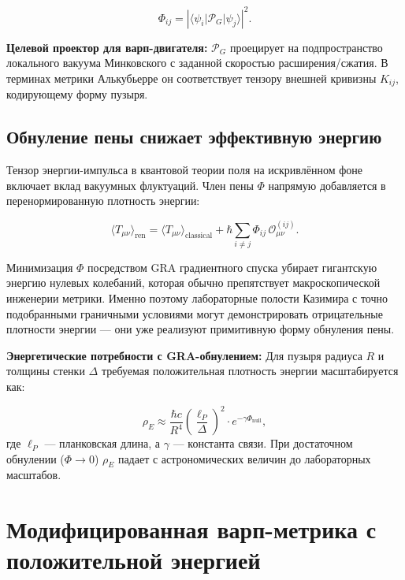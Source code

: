 \documentclass[11pt]{article}
\begin{document}
\begin{equation}
\Phi_{ij} = \left| \langle \psi_i | \mathcal{P}_G | \psi_j \rangle \right|^2.
\label{eq:foam_cell}
\end{equation}

\textbf{Целевой проектор для варп-двигателя:} $\mathcal{P}_G$ проецирует на подпространство локального вакуума Минковского с заданной скоростью расширения/сжатия. В терминах метрики Алькубьерре он соответствует тензору внешней кривизны $K_{ij}$, кодирующему форму пузыря.

\subsection{Обнуление пены снижает эффективную энергию}

Тензор энергии-импульса в квантовой теории поля на искривлённом фоне включает вклад вакуумных флуктуаций. Член пены $\Phi$ напрямую добавляется в перенормированную плотность энергии:

\begin{equation}
\langle T_{\mu\nu} \rangle_{\text{ren}} = \langle T_{\mu\nu} \rangle_{\text{classical}} + \hbar \sum_{i \neq j} \Phi_{ij} \, \mathcal{O}_{\mu\nu}^{(ij)}.
\label{eq:renormalized_energy}
\end{equation}

Минимизация $\Phi$ посредством GRA градиентного спуска убирает гигантскую энергию нулевых колебаний, которая обычно препятствует макроскопической инженерии метрики. Именно поэтому лабораторные полости Казимира с точно подобранными граничными условиями могут демонстрировать отрицательные плотности энергии — они уже реализуют примитивную форму обнуления пены.

\textbf{Энергетические потребности с GRA-обнулением:} Для пузыря радиуса $R$ и толщины стенки $\Delta$ требуемая положительная плотность энергии масштабируется как:

\begin{equation}
\rho_E \approx \frac{\hbar c}{R^4} \left( \frac{\ell_P}{\Delta} \right)^2 \cdot e^{-\gamma \Phi_{\text{null}}},
\label{eq:energy_scaling}
\end{equation}
где $\ell_P$ — планковская длина, а $\gamma$ — константа связи. При достаточном обнулении ($\Phi \to 0$) $\rho_E$ падает с астрономических величин до лабораторных масштабов.

\section{Модифицированная варп-метрика с положительной энергией}
\end{document}
